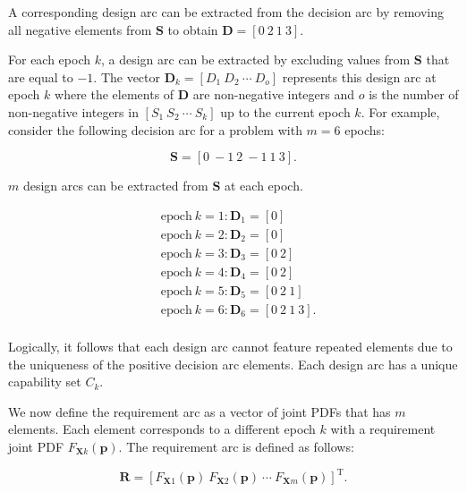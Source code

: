A corresponding design arc can be extracted from the decision arc by removing all negative elements from $\mathbf{S}$ to obtain $\mathbf{D} = \left[0 ~ 2 ~ 1 ~ 3\right]$. 

For each epoch $k$, a design arc can be extracted by excluding values from $\mathbf{S}$ that are equal to $-1$. The vector $\mathbf{D}_k = \left[D_1 ~ D_2 ~ \cdots ~ D_o\right]$ represents this design arc at epoch $k$ where the elements of $\mathbf{D}$ are non-negative integers and $o$ is the number of non-negative integers in $\left[S_1 ~ S_2 ~ \cdots ~ S_k\right]$ up to the current epoch $k$. For example, consider the following decision arc for a problem with $m=6$ epochs:

\begin{equation*} \label{eq:decisionarcex}
	\mathbf{S} = \left[0 ~ -1 ~ 2 ~ -1 ~ 1 ~ 3\right].
\end{equation*}

$m$ design arcs can be extracted from $\mathbf{S}$ at each epoch.

\begin{equation*}
	\begin{aligned}
		& \mathrm{epoch~} k=1: \mathbf{D}_1 = \left[0\right]\\
		& \mathrm{epoch~} k=2: \mathbf{D}_2 = \left[0\right]\\
		& \mathrm{epoch~} k=3: \mathbf{D}_3 = \left[0 ~ 2\right]\\
		& \mathrm{epoch~} k=4: \mathbf{D}_4 = \left[0 ~ 2\right]\\
		& \mathrm{epoch~} k=5: \mathbf{D}_5 = \left[0 ~ 2 ~ 1\right]\\
		& \mathrm{epoch~} k=6: \mathbf{D}_6 = \left[0 ~ 2 ~ 1 ~ 3\right].\\
	\end{aligned}
\end{equation*}

Logically, it follows that each design arc cannot feature repeated elements due to the uniqueness of the positive decision arc elements. Each design arc has a unique capability set $C_k$.

We now define the requirement arc as a vector of joint \acp{PDF} that has $m$ elements. Each element corresponds to a different epoch $k$ with a requirement joint \ac{PDF} $F_{\mathbf{X}k}(\mathbf{p})$. The requirement arc is defined as follows:

\begin{equation} \label{eq:requirementarc}
	\mathbf{R} = \left[F_{\mathbf{X}1}(\mathbf{p}) ~ F_{\mathbf{X}2}(\mathbf{p}) ~ \cdots ~ F_{\mathbf{X}m}(\mathbf{p})\right]^{\mathrm{T}}.
\end{equation}

